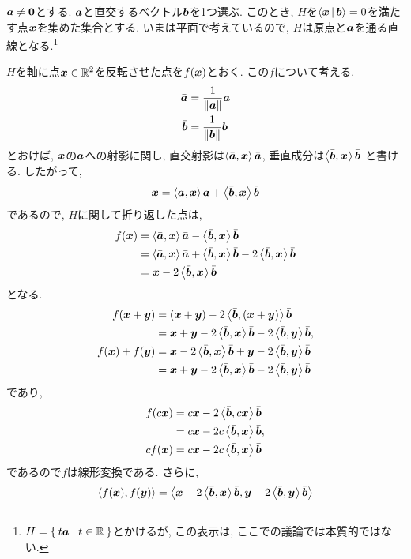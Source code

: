 \begin{example}
  \label{ex:refl}
  $\aaa\neq\zzero$とする.
  $\aaa$と直交するベクトル$\bbb$を1つ選ぶ.
  このとき, $H$を$\Braket{\xx|\bbb}=0$を満たす点$\xx$を集めた集合とする.
  いまは平面で考えているので, $H$は原点と$\aaa$を通る直線となる.\footnote{$H=\Set{t\aaa|t\in\RR}$とかけるが, この表示は, ここでの議論では本質的ではない.}

  $H$を軸に点$\xx\in\RR^2$を反転させた点を$f(\xx)$とおく.
  この$f$について考える.
  \begin{align*}
    \bar\aaa&=\frac{1}{\|\aaa\|}\aaa\\
    \bar\bbb&=\frac{1}{\|\bbb\|}\bbb
  \end{align*}
  とおけば, $\xx$の$\aaa$への射影に関し,
  直交射影は$\Braket{\bar\aaa,\xx}\bar\aaa$,
  垂直成分は$\Braket{\bar\bbb,\xx}\bar\bbb$
  と書ける. したがって,
  \begin{align*}
    \xx=\Braket{\bar\aaa,\xx}\bar\aaa+\Braket{\bar\bbb,\xx}\bar\bbb
  \end{align*}
  であるので, $H$に関して折り返した点は,
  \begin{align*}
    f(\xx)&=\Braket{\bar\aaa,\xx}\bar\aaa-\Braket{\bar\bbb,\xx}\bar\bbb\\
    &=\Braket{\bar\aaa,\xx}\bar\aaa+\Braket{\bar\bbb,\xx}\bar\bbb-2\Braket{\bar\bbb,\xx}\bar\bbb\\
    &=\xx-2\Braket{\bar\bbb,\xx}\bar\bbb
  \end{align*}
  となる.
  \begin{align*}
    f(\xx+\yy)&=(\xx+\yy)-2\Braket{\bar\bbb,(\xx+\yy)}\bar\bbb\\
    &=\xx+\yy-2\Braket{\bar\bbb,\xx}\bar\bbb-2\Braket{\bar\bbb,\yy}\bar\bbb,\\
    f(\xx)+f(\yy)&=\xx-2\Braket{\bar\bbb,\xx}\bar\bbb+\yy-2\Braket{\bar\bbb,\yy}\bar\bbb\\
    &=\xx+\yy-2\Braket{\bar\bbb,\xx}\bar\bbb-2\Braket{\bar\bbb,\yy}\bar\bbb\\
  \end{align*}
  であり,
  \begin{align*}
    f(c\xx)&=c\xx-2\Braket{\bar\bbb,c\xx}\bar\bbb\\
    &=c\xx-2c\Braket{\bar\bbb,\xx}\bar\bbb,\\
    cf(\xx)&=c\xx-2c\Braket{\bar\bbb,\xx}\bar\bbb
  \end{align*}
  であるので$f$は線形変換である.  さらに,
  \begin{align*}
    \Braket{f(\xx),f(\yy)}
    &=\Braket{\xx-2\Braket{\bar\bbb,\xx}\bar\bbb,\yy-2\Braket{\bar\bbb,\yy}\bar\bbb}\\

\end{align*}
\end{example}
